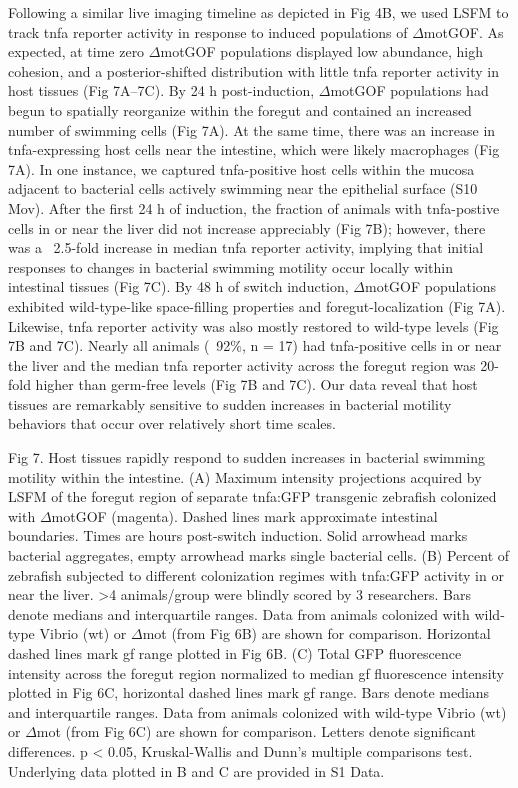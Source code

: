 Following a similar live imaging timeline as depicted in Fig 4B, we used LSFM to track tnfa reporter activity in response to induced populations of $\Delta$motGOF. As expected, at time zero $\Delta$motGOF populations displayed low abundance, high cohesion, and a posterior-shifted distribution with little tnfa reporter activity in host tissues (Fig 7A–7C). By 24 h post-induction, $\Delta$motGOF populations had begun to spatially reorganize within the foregut and contained an increased number of swimming cells (Fig 7A). At the same time, there was an increase in tnfa-expressing host cells near the intestine, which were likely macrophages (Fig 7A). In one instance, we captured tnfa-positive host cells within the mucosa adjacent to bacterial cells actively swimming near the epithelial surface (S10 Mov). After the first 24 h of induction, the fraction of animals with tnfa-postive cells in or near the liver did not increase appreciably (Fig 7B); however, there was a ~2.5-fold increase in median tnfa reporter activity, implying that initial responses to changes in bacterial swimming motility occur locally within intestinal tissues (Fig 7C). By 48 h of switch induction, $\Delta$motGOF populations exhibited wild-type-like space-filling properties and foregut-localization (Fig 7A). Likewise, tnfa reporter activity was also mostly restored to wild-type levels (Fig 7B and 7C). Nearly all animals (~92\%, n = 17) had tnfa-positive cells in or near the liver and the median tnfa reporter activity across the foregut region was 20-fold higher than germ-free levels (Fig 7B and 7C). Our data reveal that host tissues are remarkably sensitive to sudden increases in bacterial motility behaviors that occur over relatively short time scales. 

Fig 7. Host tissues rapidly respond to sudden increases in bacterial swimming motility within the intestine. 
(A) Maximum intensity projections acquired by LSFM of the foregut region of separate tnfa:GFP transgenic zebrafish colonized with $\Delta$motGOF (magenta). Dashed lines mark approximate intestinal boundaries. Times are hours post-switch induction. Solid arrowhead marks bacterial aggregates, empty arrowhead marks single bacterial cells. (B) Percent of zebrafish subjected to different colonization regimes with tnfa:GFP activity in or near the liver. >4 animals/group were blindly scored by 3 researchers. Bars denote medians and interquartile ranges. Data from animals colonized with wild-type Vibrio (wt) or $\Delta$mot (from Fig 6B) are shown for comparison. Horizontal dashed lines mark gf range plotted in Fig 6B. (C) Total GFP fluorescence intensity across the foregut region normalized to median gf fluorescence intensity plotted in Fig 6C, horizontal dashed lines mark gf range. Bars denote medians and interquartile ranges. Data from animals colonized with wild-type Vibrio (wt) or $\Delta$mot (from Fig 6C) are shown for comparison. Letters denote significant differences. p < 0.05, Kruskal-Wallis and Dunn's multiple comparisons test. Underlying data plotted in B and C are provided in S1 Data.

